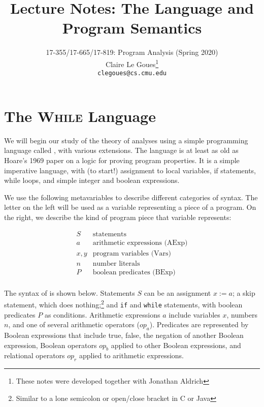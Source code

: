 \documentclass[11pt]{article}
\title{Lecture Notes: The \WhileLang Language and Program Semantics}
\author{17-355/17-665/17-819: Program Analysis (Spring 2020)\\
        Claire Le Goues\footnote{These notes were developed together with Jonathan Aldrich}\\
		{\tt clegoues@cs.cmu.edu}
        }
\date{}
\begin{document}
\maketitle

\section{The \textsc{While} Language}

We will begin our study of the theory of analyses using a simple programming language called
\WhileLang, with various extensions.  The \WhileLang language is at least as old as
Hoare's 1969 paper on a logic for proving program properties.  It is a simple
imperative language, with (to start!) assignment to local variables, if
statements, while loops, and simple integer and boolean expressions.

We use the following metavariables to describe different categories of syntax.
The letter on the left will be used as a variable representing a piece of a
program. On the right, we describe the kind of program piece that variable
represents:

\[
\begin{array}{ll}
S   & \mbox{statements}\\
a   & \mbox{arithmetic expressions (AExp)}\\
x,y & \mbox{program variables (Vars)} \\
n   & \mbox{number literals}\\
P   & \mbox{boolean predicates (BExp)}\\
\end{array}
\]

The syntax of \WhileLang is shown below.  Statements $S$ can be an assignment $x :=
a$; a skip statement, which does nothing;\footnote{Similar to a lone semicolon
  or open/close bracket in C or Java} and \texttt{if} and \texttt{while}
statements, with boolean predicates $P$ as conditions.  Arithmetic expressions
$a$ include variables $x$, numbers $n$, and one of several arithmetic operators
($op_a$).  Predicates are represented by Boolean expressions that include true, false, the negation of another
Boolean expression, Boolean operators $op_b$ applied to other Boolean
expressions, and relational operators $op_r$ applied to arithmetic expressions.

\newcommand\df{\bnfdef}
\newcommand\da{\bnfalt}
\newcommand\skips{\mbox{skip}}
\newcommand\ifs{\mbox{if}~ P ~\mbox{then}~ S_1 ~\mbox{else}~ S_2}
\newcommand\whiles{\mbox{while}~ P ~\mbox{do}~ S}
\end{document}
